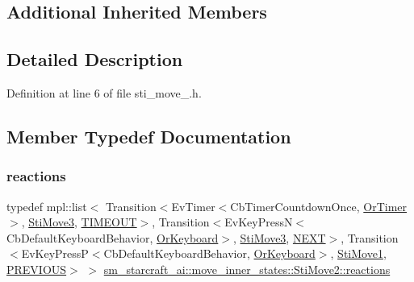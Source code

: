 \subsection*{Additional Inherited Members}


\subsection{Detailed Description}


Definition at line 6 of file sti\+\_\+move\+\_.\+h.



\subsection{Member Typedef Documentation}
\mbox{\label{structsm__starcraft__ai_1_1move__inner__states_1_1StiMove2_a8187cf9544687d15078665a7065c1360}} 
\subsubsection{\texorpdfstring{reactions}{reactions}}
{\footnotesize\ttfamily typedef mpl\+::list$<$ Transition$<$Ev\+Timer$<$Cb\+Timer\+Countdown\+Once, \hyperlink{classsm__starcraft__ai_1_1OrTimer}{Or\+Timer}$>$, \hyperlink{structsm__starcraft__ai_1_1move__inner__states_1_1StiMove3}{Sti\+Move3}, \hyperlink{structsm__starcraft__ai_1_1move__inner__states_1_1StiMove2_1_1TIMEOUT}{T\+I\+M\+E\+O\+UT}$>$, Transition$<$Ev\+Key\+PressN$<$Cb\+Default\+Keyboard\+Behavior, \hyperlink{classsm__starcraft__ai_1_1OrKeyboard}{Or\+Keyboard}$>$, \hyperlink{structsm__starcraft__ai_1_1move__inner__states_1_1StiMove3}{Sti\+Move3}, \hyperlink{structsm__starcraft__ai_1_1move__inner__states_1_1StiMove2_1_1NEXT}{N\+E\+XT}$>$, Transition$<$Ev\+Key\+PressP$<$Cb\+Default\+Keyboard\+Behavior, \hyperlink{classsm__starcraft__ai_1_1OrKeyboard}{Or\+Keyboard}$>$, \hyperlink{structsm__starcraft__ai_1_1move__inner__states_1_1StiMove1}{Sti\+Move1}, \hyperlink{structsm__starcraft__ai_1_1move__inner__states_1_1StiMove2_1_1PREVIOUS}{P\+R\+E\+V\+I\+O\+US}$>$ $>$ \hyperlink{structsm__starcraft__ai_1_1move__inner__states_1_1StiMove2_a8187cf9544687d15078665a7065c1360}{sm\+\_\+starcraft\+\_\+ai\+::move\+\_\+inner\+\_\+states\+::\+Sti\+Move2\+::reactions}}



